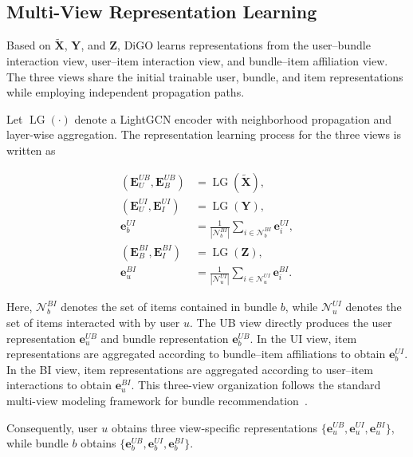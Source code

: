 \documentclass[letterpaper]{article}
\begin{document}
\subsection{Multi-View Representation Learning}

Based on $\widetilde{\mathbf X}$, $\mathbf Y$, and $\mathbf Z$,
DiGO learns representations from the user--bundle interaction
view, user--item interaction view, and bundle--item affiliation
view. The three views share the initial trainable user, bundle,
and item representations while employing independent propagation
paths.

Let $\operatorname{LG}(\cdot)$ denote a LightGCN encoder with
neighborhood propagation and layer-wise aggregation. The
representation learning process for the three views is written as

\begin{equation}
\begin{aligned}
\left(
\mathbf E_U^{UB},
\mathbf E_B^{UB}
\right)
&=
\operatorname{LG}
\left(
\widetilde{\mathbf X}
\right),
\\
\left(
\mathbf E_U^{UI},
\mathbf E_I^{UI}
\right)
&=
\operatorname{LG}
\left(
\mathbf Y
\right),
\\
\mathbf e_b^{UI}
&=
\frac{1}{|\mathcal N_b^{BI}|}
\sum_{i\in\mathcal N_b^{BI}}
\mathbf e_i^{UI},
\\
\left(
\mathbf E_B^{BI},
\mathbf E_I^{BI}
\right)
&=
\operatorname{LG}
\left(
\mathbf Z
\right),
\\
\mathbf e_u^{BI}
&=
\frac{1}{|\mathcal N_u^{UI}|}
\sum_{i\in\mathcal N_u^{UI}}
\mathbf e_i^{BI}.
\end{aligned}
\tag{7}
\end{equation}

Here, $\mathcal N_b^{BI}$ denotes the set of items contained in
bundle $b$, while $\mathcal N_u^{UI}$ denotes the set of items
interacted with by user $u$. The UB view directly produces the
user representation $\mathbf e_u^{UB}$ and bundle representation
$\mathbf e_b^{UB}$. In the UI view, item representations are
aggregated according to bundle--item affiliations to obtain
$\mathbf e_b^{UI}$. In the BI view, item representations are
aggregated according to user--item interactions to obtain
$\mathbf e_u^{BI}$. This three-view organization follows the
standard multi-view modeling framework for bundle
recommendation~\cite{ma2024multicbr}.

Consequently, user $u$ obtains three view-specific representations
$\{\mathbf e_u^{UB},\mathbf e_u^{UI},\mathbf e_u^{BI}\}$, while
bundle $b$ obtains
$\{\mathbf e_b^{UB},\mathbf e_b^{UI},\mathbf e_b^{BI}\}$.
\end{document}
